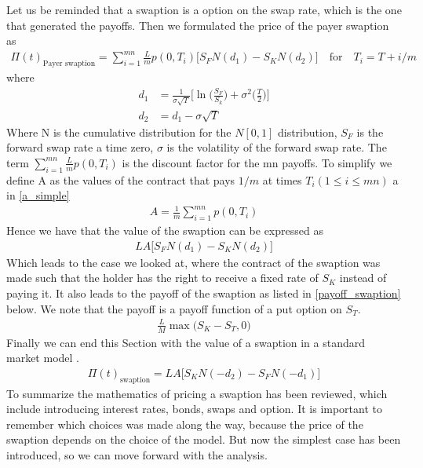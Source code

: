 Let us be reminded that a swaption is a option on the swap rate, which is the one that generated the payoffs.
Then we formulated the price of the payer swaption as \cite{Hull}
\begin{align*}
    \Pi(t)_{\text{Payer swaption}} = \sum_{i=1}^{mn} \frac{L}{m} p(0,T_i)\Big[ S_F N(d_1) - S_K N(d_2)\Big] \quad \text{for} \quad T_i= T+i/m  
\end{align*}
where
\begin{align*}
    d_1 & = \frac{1}{\sigma \sqrt{T}} \Big[ \ln \Big(\frac{S_F}{S_k}\Big)+\sigma^2\Big(\frac{T}{2}\Big)\Big] \\
    d_2 & = d_1-\sigma \sqrt{T}
\end{align*}
Where N is the cumulative distribution for the $N [0,1]$ distribution, $S_F$ is the forward swap rate a time
zero, $\sigma$ is the volatility of the forward swap rate. The term $\sum_{i=1}^{mn} \frac{L}{m} p(0,T_i)$ 
is the discount factor for the mn payoffs. To simplify we define A as the values of the contract that
pays $1/m$ at times $T_i ( 1\leq i \leq mn)$ a in \autoref{a_simple}
\begin{align}
    A= \frac{1}{m} \sum_{i=1}^{mn} p(0,T_i)
    \label{a_simple}
\end{align}
Hence we have that the value of the swaption can be expressed as 
\begin{align*}
    L A \Big[S_F N(d_1) - S_K N(d_2) \Big]
\end{align*}
Which leads to the case we looked at, where the contract of the swaption was made such that the 
holder has the right to receive a fixed rate of $S_K$ instead of paying it. It also leads to
the payoff of the swaption as listed in \autoref{payoff_swaption} below. We note that the payoff 
is a payoff function of a put option on $S_T$. 
\begin{align}
    \frac{L}{M} \max \Big( S_K - S_T, 0 \Big)
    \label{payoff_swaption}
\end{align}
Finally we can end this Section with the value of a swaption in a standard market model \cite{Hull}.
\begin{align*}
    \Pi(t)_{\text{swaption}}= L A \Big[S_K N(-d_2) - S_F N(-d_1)\Big]
\end{align*}
To summarize the mathematics of pricing a swaption has been reviewed, which include introducing interest rates, 
bonds, swaps and option. It is important to remember which choices was made along the way,
because the price of the swaption depends on the choice of the model. But now the simplest case has been 
introduced, so we can move forward with the analysis. 